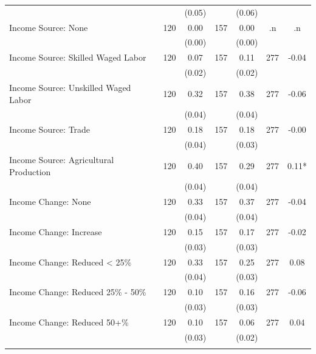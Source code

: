 \begin{tabular}{@{\extracolsep{5pt}}lcccccc}
 &   & (0.05)  &   & (0.06)  &   &  \\ [1ex]
Income Source: None   & 120    & 0.00    & 157    & 0.00    & .n    & .n   \\
 &   & (0.00)  &   & (0.00)  &   &  \\ [1ex]
Income Source: Skilled Waged Labor   & 120    & 0.07    & 157    & 0.11    & 277    & -0.04   \\
 &   & (0.02)  &   & (0.02)  &   &  \\ [1ex]
Income Source: Unskilled Waged Labor   & 120    & 0.32    & 157    & 0.38    & 277    & -0.06   \\
 &   & (0.04)  &   & (0.04)  &   &  \\ [1ex]
Income Source: Trade   & 120    & 0.18    & 157    & 0.18    & 277    & -0.00   \\
 &   & (0.04)  &   & (0.03)  &   &  \\ [1ex]
Income Source: Agricultural Production   & 120    & 0.40    & 157    & 0.29    & 277    & 0.11*   \\
 &   & (0.04)  &   & (0.04)  &   &  \\ [1ex]
Income Change: None   & 120    & 0.33    & 157    & 0.37    & 277    & -0.04   \\
 &   & (0.04)  &   & (0.04)  &   &  \\ [1ex]
Income Change: Increase   & 120    & 0.15    & 157    & 0.17    & 277    & -0.02   \\
 &   & (0.03)  &   & (0.03)  &   &  \\ [1ex]
Income Change: Reduced < 25\%   & 120    & 0.33    & 157    & 0.25    & 277    & 0.08   \\
 &   & (0.04)  &   & (0.03)  &   &  \\ [1ex]
Income Change: Reduced 25\% - 50\%   & 120    & 0.10    & 157    & 0.16    & 277    & -0.06   \\
 &   & (0.03)  &   & (0.03)  &   &  \\ [1ex]
Income Change: Reduced 50+\%   & 120    & 0.10    & 157    & 0.06    & 277    & 0.04   \\
 &   & (0.03)  &   & (0.02)  &   &  \\ [1ex]
\hline \hline \\[-1.8ex]

\end{tabular}
